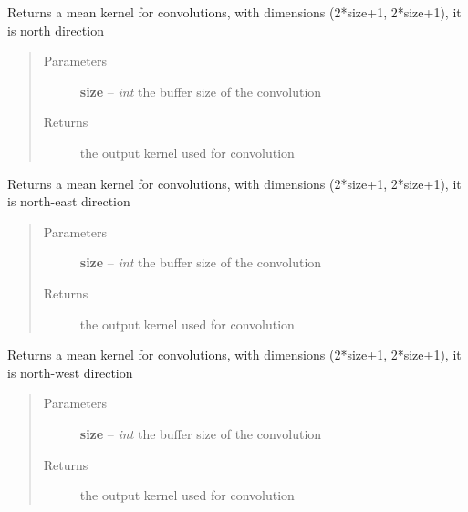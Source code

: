 \documentclass[letterpaper,10pt,english]{sphinxmanual}
\begin{document}

\begin{fulllineitems}
\label{docs/shielding:shield_mult.kern_n}
Returns a mean kernel for convolutions, with dimensions
(2*size+1, 2*size+1), it is north direction
\begin{quote}\begin{description}
\item[{Parameters}] \leavevmode
\textbf{size} -- \emph{int} the buffer size of the convolution

\item[{Returns}] \leavevmode
{} the output kernel used for convolution

\end{description}\end{quote}

\end{fulllineitems}



\begin{fulllineitems}
\label{docs/shielding:shield_mult.kern_ne}
Returns a mean kernel for convolutions, with dimensions
(2*size+1, 2*size+1), it is north-east direction
\begin{quote}\begin{description}
\item[{Parameters}] \leavevmode
\textbf{size} -- \emph{int} the buffer size of the convolution

\item[{Returns}] \leavevmode
{} the output kernel used for convolution

\end{description}\end{quote}

\end{fulllineitems}



\begin{fulllineitems}
\label{docs/shielding:shield_mult.kern_nw}
Returns a mean kernel for convolutions, with dimensions
(2*size+1, 2*size+1), it is north-west direction
\begin{quote}\begin{description}
\item[{Parameters}] \leavevmode
\textbf{size} -- \emph{int} the buffer size of the convolution

\item[{Returns}] \leavevmode
{} the output kernel used for convolution

\end{description}\end{quote}

\end{fulllineitems}
\end{document}

